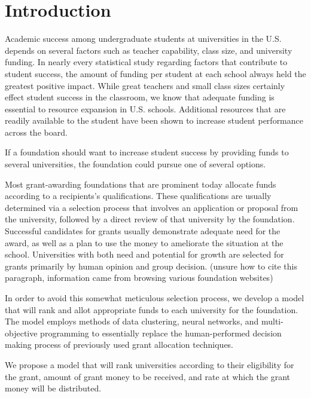 \documentclass[paper.tex]{subfiles}
\begin{document}
	\section{Introduction}
	Academic success among undergraduate students at universities in the U.S. depends on several factors such as teacher capability, class size, and university funding. In nearly every statistical study regarding factors that contribute to student success, the amount of funding per student at each school always held the greatest positive impact.\cite{greenwald1996effect}  While great teachers and small class sizes certainly effect student success in the classroom, we know that adequate funding is essential to resource expansion in U.S. schools.\cite{hedges1994exchange} Additional resources that are readily available to the student have been shown to increase student performance across the board. 

	If a foundation should want to increase student success by providing funds to several universities, the foundation could pursue one of several options.
	
	Most grant-awarding foundations that are prominent today allocate funds according to a recipients's qualifications. These qualifications are usually determined via a selection process that involves an application or proposal from the university, followed by a direct review of that university by the foundation. Successful candidates for grants usually demonstrate adequate need for the award, as well as a plan to use the money to ameliorate the situation at the school. Universities with both need and potential for growth are selected for grants primarily by human opinion and group decision. (unsure how to cite this paragraph, information came from browsing various foundation websites)

	In order to avoid this somewhat meticulous selection process, we develop a model that will rank and allot appropriate funds to each university for the foundation. The model employs methods of data clustering, neural networks, and multi-objective programming to essentially replace the human-performed decision making process of previously used grant allocation techniques.
	
	We propose a model that will rank universities according to their eligibility for the grant, amount of grant money to be received, and rate at which the grant money will be distributed.
	 
\end{document}
